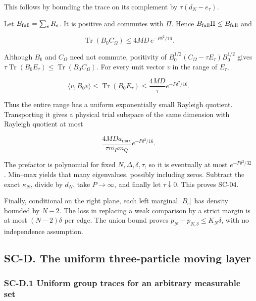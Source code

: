This follows by bounding the trace on its complement by \(\tau(d_N-e_\tau)\).

Let \(B_{\rm full}=\sum_eR_e\). It is positive and commutes with \(\Pi\). Hence \(B_{\rm full}\Pi\leq B_{\rm full}\) and

\[
\operatorname{Tr}(B_0C_\Omega)\leq4MD\,e^{-P\delta^2/16}.
\]

Although \(B_0\) and \(C_\Omega\) need not commute, positivity of \(B_0^{1/2}(C_\Omega-\tau E_\tau)B_0^{1/2}\) gives \(\tau\operatorname{Tr}(B_0E_\tau)\leq\operatorname{Tr}(B_0C_\Omega)\). For every unit vector \(v\) in the range of \(E_\tau\),

\[
\langle v,B_0v\rangle
\leq\operatorname{Tr}(B_0E_\tau)
\leq\frac{4MD}{\tau}e^{-P\delta^2/16}.
\]

Thus the entire range has a uniform exponentially small Rayleigh quotient. Transporting it gives a physical trial subspace of the same dimension with Rayleigh quotient at most

\[
\frac{4MDa_{\max}}{\tau m_Pm_Q}e^{-P\delta^2/16}.
\]

The prefactor is polynomial for fixed \(N,\Delta,\delta,\tau\), so it is eventually at most \(e^{-P\delta^2/32}\). Min--max yields that many eigenvalues, possibly including zeros. Subtract the exact \(\kappa_N\), divide by \(d_N\), take \(P\to\infty\), and finally let \(\tau\downarrow0\). This proves SC-04.

Finally, conditional on the right plane, each left marginal \(|B_e|\) has density bounded by \(N-2\). The loss in replacing a weak comparison by a strict margin is at most \((N-2)\delta\) per edge. The union bound proves \(p_N-p_{N,\delta}\leq K_N\delta\), with no independence assumption.

\hypertarget{sc-d.-the-uniform-three-particle-moving-layer}{%
\subsection{SC-D. The uniform three-particle moving layer}\label{sc-d.-the-uniform-three-particle-moving-layer}}

\hypertarget{sc-d.1-uniform-group-traces-for-an-arbitrary-measurable-set}{%
\subsubsection{SC-D.1 Uniform group traces for an arbitrary measurable set}\label{sc-d.1-uniform-group-traces-for-an-arbitrary-measurable-set}}

